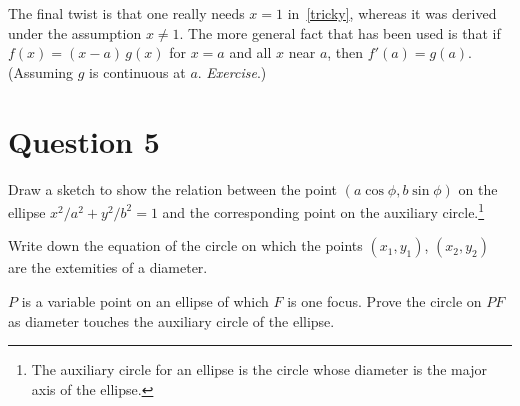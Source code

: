 \documentclass[11pt,a4paper]{report}
\theoremstyle{plain}
\theoremstyle{definition}
\begin{document}
The final twist is that one really needs $ x=1 $ in~\eqref{tricky}, whereas it was derived under the assumption $ x \neq 1 $. The more general fact that has been used is that if $ f(x) = (x-a)\, g(x) $ for $  x=a $ and all   $ x $ near $ a $, then $ f'(a) = g(a) $. (Assuming $ g $ is continuous at $ a $.  \emph{Exercise}.)




\newpage
\section*{Question 5}

Draw a sketch to show the relation between the point  $ (a\cos\phi, b\sin\phi ) $ on the ellipse $ x^2/a^2 + y^2/b^2 = 1 $ and the corresponding point on the auxiliary circle.\footnote{The auxiliary circle for an ellipse is the circle whose diameter is the major axis of the ellipse.}

Write down the equation of the circle on which the points $ (x_1,y_1) $, $ (x_2,y_2) $ are the extemities of a diameter.

$ P $ is a variable point on an ellipse of which $ F $ is one focus.  Prove the circle on $ PF $ as diameter touches the auxiliary circle of the ellipse.


\bigskip
\end{document}
